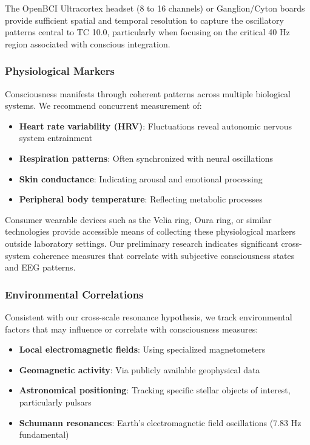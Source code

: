\documentclass[12pt]{article}
\begin{document}
The OpenBCI Ultracortex headset (8 to 16 channels) or Ganglion/Cyton boards provide sufficient spatial and temporal resolution to capture the oscillatory patterns central to TC 10.0, particularly when focusing on the critical 40 Hz region associated with conscious integration.

\subsubsection{Physiological Markers}

Consciousness manifests through coherent patterns across multiple biological systems. We recommend concurrent measurement of:

\begin{itemize}
    \item \textbf{Heart rate variability (HRV)}: Fluctuations reveal autonomic nervous system entrainment
    \item \textbf{Respiration patterns}: Often synchronized with neural oscillations
    \item \textbf{Skin conductance}: Indicating arousal and emotional processing
    \item \textbf{Peripheral body temperature}: Reflecting metabolic processes
\end{itemize}

Consumer wearable devices such as the Velia ring, Oura ring, or similar technologies provide accessible means of collecting these physiological markers outside laboratory settings. Our preliminary research indicates significant cross-system coherence measures that correlate with subjective consciousness states and EEG patterns.

\subsubsection{Environmental Correlations}

Consistent with our cross-scale resonance hypothesis, we track environmental factors that may influence or correlate with consciousness measures:

\begin{itemize}
    \item \textbf{Local electromagnetic fields}: Using specialized magnetometers
    \item \textbf{Geomagnetic activity}: Via publicly available geophysical data
    \item \textbf{Astronomical positioning}: Tracking specific stellar objects of interest, particularly pulsars
    \item \textbf{Schumann resonances}: Earth's electromagnetic field oscillations (7.83 Hz fundamental)
\end{itemize}
\end{document}
